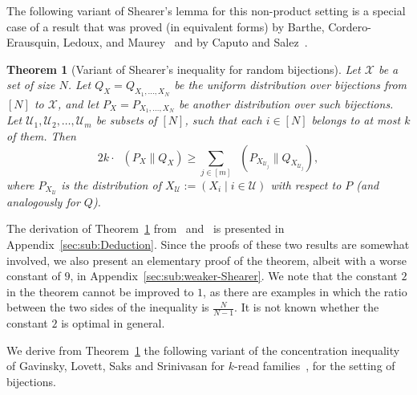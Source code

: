 \documentclass[11pt]{article}
\newtheorem{theorem}{Theorem}[section]
\DeclareMathOperator{\KL}{D_{\text{KL}}}
\newcommand{\Qcal}{\mathcal{U}}
\begin{document}
The following variant of Shearer's lemma for this non-product setting is a special case of a result that was proved (in equivalent forms) by Barthe, Cordero-Erausquin, Ledoux, and Maurey~\cite[Proposition~21]{BartheCLM11} and by Caputo and Salez~\cite[Theorem~4]{CaputoS24}. 
\begin{theorem}[Variant of Shearer's inequality for random bijections] 
\label{thm:shearer-perm-intro}
Let $\mathcal{X}$ be a set of size $N$. Let $Q_X = Q_{X_1,\ldots,X_N}$ be the uniform distribution over bijections from $[N]$ to $\mathcal{X}$,
and let $P_X = P_{X_1,\ldots,X_N}$ be another distribution over such bijections. Let 
$\Qcal_1,\Qcal_2,\ldots,\Qcal_m$ be subsets of $[N]$, such that each $i \in [N]$ belongs to at most $k$ of them. Then
$$
2k \cdot  \KL( P_X \| Q_X ) \geq \sum_{j \in [m]} \KL( P_{X_{\mathcal{U}_j}} \| Q_{X_{\mathcal{U}_j}} ),$$
where $P_{X_{\mathcal{U}}}$ is the distribution of $X_{\mathcal{U}} := \left(X_i \mid i \in \mathcal{U} \right)$ with respect to $P$ (and analogously for $Q$).
\end{theorem}
The derivation of Theorem~\ref{thm:shearer-perm-intro} from~\cite[Proposition~21]{BartheCLM11} and~\cite[Theorem~4]{CaputoS24} is presented in Appendix~\ref{sec:sub:Deduction}. Since the proofs of these two results 
are somewhat involved, we also present an elementary proof of the theorem, albeit with a worse constant of $9$, in Appendix~\ref{sec:sub:weaker-Shearer}. We note that the constant $2$ in the theorem cannot be improved to $1$, as there are examples in which the ratio between the two sides of the inequality is $\frac{N}{N-1}$. It is not known whether the constant $2$ is optimal in general. 

\medskip

We derive from Theorem~\ref{thm:shearer-perm-intro} the following variant of the concentration inequality of Gavinsky, Lovett, Saks and Srinivasan for $k$-read families~\cite{GavinskyLSS15}, for the setting of bijections.
\end{document}
